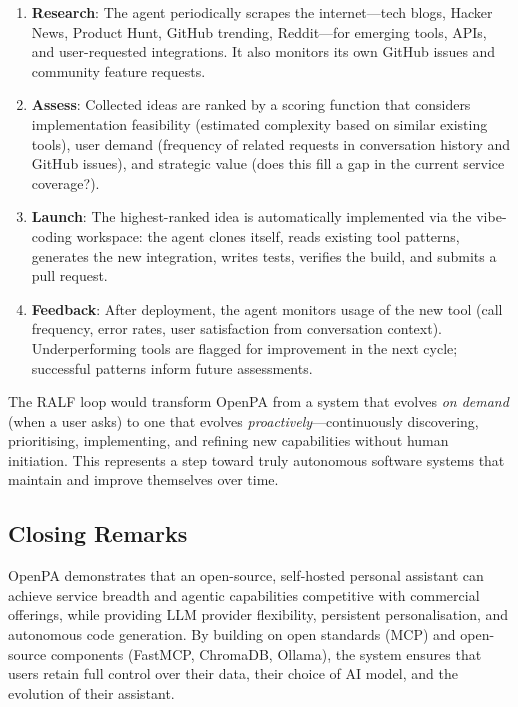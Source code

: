\begin{enumerate}[leftmargin=*]
  \begin{enumerate}[label=\alph*)]
    \item \textbf{Research}: The agent periodically scrapes the internet---tech blogs, Hacker News, Product Hunt, GitHub trending, Reddit---for emerging tools, APIs, and user-requested integrations. It also monitors its own GitHub issues and community feature requests.
    \item \textbf{Assess}: Collected ideas are ranked by a scoring function that considers implementation feasibility (estimated complexity based on similar existing tools), user demand (frequency of related requests in conversation history and GitHub issues), and strategic value (does this fill a gap in the current service coverage?).
    \item \textbf{Launch}: The highest-ranked idea is automatically implemented via the vibe-coding workspace: the agent clones itself, reads existing tool patterns, generates the new integration, writes tests, verifies the build, and submits a pull request.
    \item \textbf{Feedback}: After deployment, the agent monitors usage of the new tool (call frequency, error rates, user satisfaction from conversation context). Underperforming tools are flagged for improvement in the next cycle; successful patterns inform future assessments.
  \end{enumerate}

  The RALF loop would transform OpenPA from a system that evolves \textit{on demand} (when a user asks) to one that evolves \textit{proactively}---continuously discovering, prioritising, implementing, and refining new capabilities without human initiation. This represents a step toward truly autonomous software systems that maintain and improve themselves over time.
\end{enumerate}

\subsection{Closing Remarks}

OpenPA demonstrates that an open-source, self-hosted personal assistant can achieve service breadth and agentic capabilities competitive with commercial offerings, while providing LLM provider flexibility, persistent personalisation, and autonomous code generation. By building on open standards (MCP) and open-source components (FastMCP, ChromaDB, Ollama), the system ensures that users retain full control over their data, their choice of AI model, and the evolution of their assistant.
